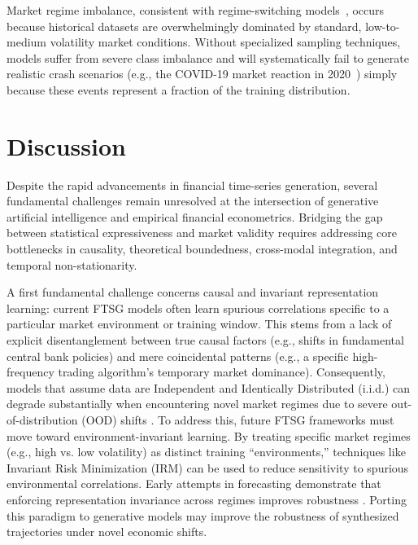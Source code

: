 \documentclass[11pt,a4paper]{article}
\begin{document}
Market regime imbalance, consistent with regime-switching models~\citep{hamilton1989new}, occurs because historical datasets are overwhelmingly dominated by standard, low-to-medium volatility market conditions. Without specialized sampling techniques, models suffer from severe class imbalance and will systematically fail to generate realistic crash scenarios (e.g., the COVID-19 market reaction in 2020~\citep{ramelli2020feverish}) simply because these events represent a fraction of the training distribution.


\section{Discussion}
\label{sec:discussion}

Despite the rapid advancements in financial time-series generation, several fundamental challenges remain unresolved at the intersection of generative artificial intelligence and empirical financial econometrics. Bridging the gap between statistical expressiveness and market validity requires addressing core bottlenecks in causality, theoretical boundedness, cross-modal integration, and temporal non-stationarity.

A first fundamental challenge concerns causal and invariant representation learning: current FTSG models often learn spurious correlations specific to a particular market environment or training window. This stems from a lack of explicit disentanglement between true causal factors (e.g., shifts in fundamental central bank policies) and mere coincidental patterns (e.g., a specific high-frequency trading algorithm's temporary market dominance). Consequently, models that assume data are Independent and Identically Distributed (i.i.d.) can degrade substantially when encountering novel market regimes due to severe out-of-distribution (OOD) shifts \citep{arjovsky2019invariant, peters2016causal}. 
To address this, future FTSG frameworks must move toward environment-invariant learning. By treating specific market regimes (e.g., high vs. low volatility) as distinct training ``environments,'' techniques like Invariant Risk Minimization (IRM) \citep{arjovsky2019invariant} can be used to reduce sensitivity to spurious environmental correlations. Early attempts in forecasting demonstrate that enforcing representation invariance across regimes improves robustness \citep{cao2023irm}. Porting this paradigm to generative models may improve the robustness of synthesized trajectories under novel economic shifts.
\end{document}
